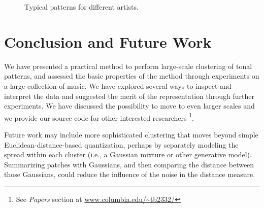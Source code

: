 \documentclass{article}
\begin{document}
\begin{figure}[h]
  \centering
  \hspace{5mm}                
  \vspace{2mm}
  \caption{\small{Typical patterns for different artists.}}
  \label{fig:typicalpat}
\end{figure}



\section{Conclusion and Future Work}
We have presented a practical method to perform large-scale clustering of
tonal patterns, and assessed the basic properties of the method through
experiments on a large collection of music. We have explored several ways
to inspect and interpret the data 
and suggested the merit of the representation
through further experiments.
We have discussed the possibility to move to even larger scales
and we provide our source code for other interested 
researchers
\footnote{See \textit{Papers} section at \url{www.columbia.edu/~tb2332/}}.

Future work may include more sophisticated clustering that moves 
beyond simple Euclidean-distance-based quantization, perhaps 
by separately modeling the spread within each cluster (i.e., a Gaussian 
mixture or other generative model). 
Summarizing patches
with Gaussians, and then comparing the distance between those Gaussians,
could reduce the influence of the noise in the distance measure.
\end{document}
